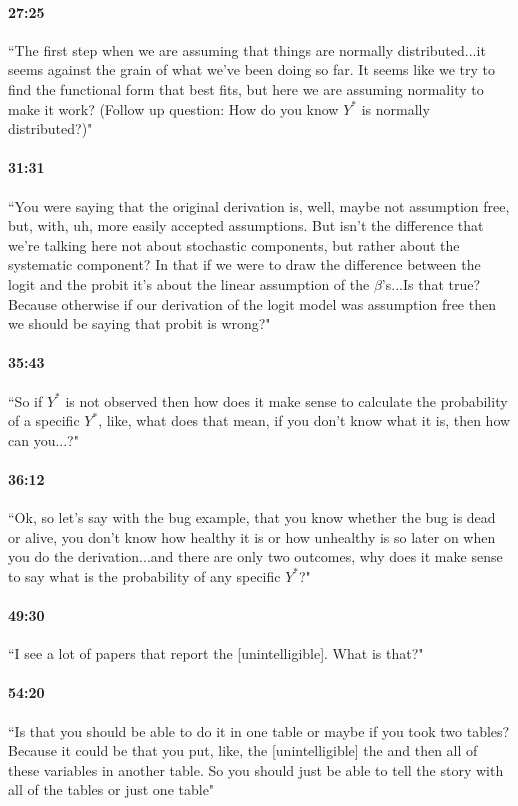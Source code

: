 \documentclass[11pt]{article}
\begin{document}
\paragraph{27:25} ``The first step when we are assuming that things are normally distributed...it seems against the grain of what we've been doing so far. It seems like we try to find the functional form that best fits, but here we are assuming normality to make it work? (Follow up question: How do you know $Y^*$ is normally distributed?)"

\paragraph{31:31} ``You were saying that the original derivation is, well, maybe not assumption free, but, with, uh, more easily accepted assumptions. But isn't the difference that we're talking here not about stochastic components, but rather about the systematic component?  In that if we were to draw the difference between the logit and the probit it's about the linear assumption of the $\beta$'s...Is that true? Because otherwise if our derivation of the logit model was assumption free then we should be saying that probit is wrong?"

\paragraph{35:43} ``So if $Y^*$ is not observed then how does it make sense to calculate the probability of a specific $Y^*$, like, what does that mean, if you don't know what it is, then how can you...?"

\paragraph{36:12} ``Ok, so let's say with the bug example, that you know whether the bug is dead or alive, you don't know how healthy it is or how unhealthy is so later on when you do the derivation...and there are only two outcomes, why does it make sense to say what is the probability of any specific $Y^*$?"

\paragraph{49:30} ``I see a lot of papers that report the [unintelligible]. What is that?"

\paragraph{54:20} ``Is that you should be able to do it in one table or maybe if you took two tables? Because it could be that you put, like, the [unintelligible] the and then all of these variables in another table. So you should just be able to tell the story with all of the tables or just one table"
\end{document}
